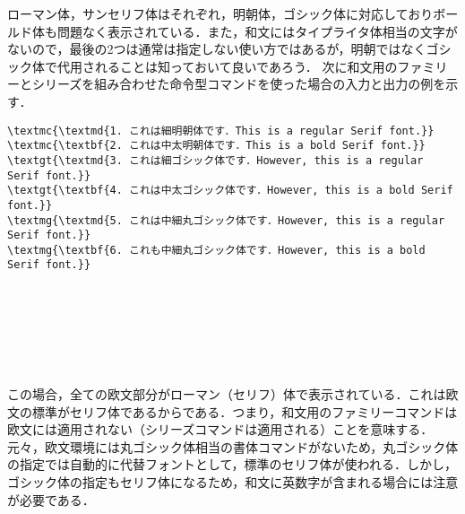 ローマン体，サンセリフ体はそれぞれ，明朝体，ゴシック体に対応しておりボールド体も問題なく表示されている．また，和文にはタイプライタ体相当の文字がないので，最後の2つは通常は指定しない使い方ではあるが，明朝ではなくゴシック体で代用されることは知っておいて良いであろう．
次に和文用のファミリーとシリーズを組み合わせた命令型コマンドを使った場合の入力と出力の例を示す．
\begin{tcolorbox}[title=\gtbf{命令型和文コマンド使用例},colback=blue!5!white,colframe=blue!70!black,enhanced,breakable=true]
\begin{lstlisting}
\textmc{\textmd{1. これは細明朝体です．This is a regular Serif font.}}
\textmc{\textbf{2. これは中太明朝体です．This is a bold Serif font.}}
\textgt{\textmd{3. これは細ゴシック体です．However, this is a regular Serif font.}}
\textgt{\textbf{4. これは中太ゴシック体です．However, this is a bold Serif font.}}
\textmg{\textmd{5. これは中細丸ゴシック体です．However, this is a regular Serif font.}}
\textmg{\textbf{6. これも中細丸ゴシック体です．However, this is a bold Serif font.}}
\end{lstlisting}
\begin{tcolorbox}[title=\gtbf{出力},colback=yellow!15!white,colframe=blue!75!black]
\\
\\
\\
\\
\\
\end{tcolorbox}
\end{tcolorbox}
この場合，全ての欧文部分がローマン（セリフ）体で表示されている．これは欧文の標準がセリフ体であるからである．つまり，和文用のファミリーコマンドは欧文には適用されない（シリーズコマンドは適用される）ことを意味する．
元々，欧文環境には丸ゴシック体相当の書体コマンドがないため，丸ゴシック体の指定では自動的に代替フォントとして，標準のセリフ体が使われる．しかし，ゴシック体の指定もセリフ体になるため，和文に英数字が含まれる場合には注意が必要である．

